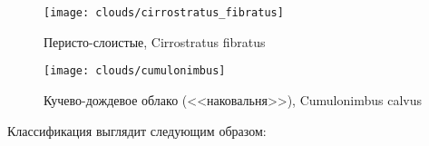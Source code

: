 {  \begin{sidewaysfigure*}
    \centering
    \texttt{[image: clouds/cirrostratus\_fibratus]}
    \caption{Перисто-слоистые, Cirrostratus fibratus}
    \label{fig:pp03}
  \end{sidewaysfigure*}

  \begin{figure*}
    \centering
    \texttt{[image: clouds/cumulonimbus]}
    \caption{Кучево-дождевое облако (<<наковальня>>), Cumulonimbus calvus}
    \label{fig:113}
  \end{figure*}
\clearpage
}

Классификация выглядит следующим образом:

